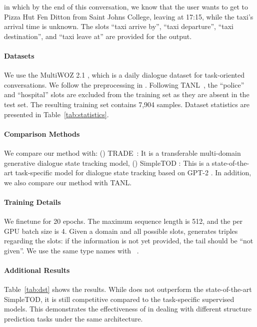 \noindent in which by the end of this conversation, we know that the user wants to get to Pizza Hut Fen Ditton from Saint Johns College, leaving at 17:15, while the taxi's arrival time is unknown. The slots ``taxi arrive by'', ``taxi departure'', ``taxi destination'', and ``taxi leave at'' are provided for the output.

\paragraph{Datasets} We use the MultiWOZ 2.1 \cite{budzianowski2018large, ramadan2018large, eric2019multiwoz, zang2020multiwoz}, which is a daily dialogue dataset for task-oriented conversations. We follow the preprocessing in \citep{wu2019transferable}. Following TANL~\cite{paolini2021structured}, the ``police'' and ``hospital'' slots are excluded from the training set as they are absent in the test set. The resulting training set contains 7,904 samples. Dataset statistics are presented in Table~\ref{tab:statistics}.

\paragraph{Comparison Methods} We compare our method with: (\expandafter{}) TRADE~\cite{wu2019transferable}: It is a transferable multi-domain generative dialogue state tracking model, (\expandafter{}) SimpleTOD \cite{hosseiniasl2020simple}: This is a state-of-the-art task-specific model for dialogue state tracking based on GPT-2 \cite{radford2019language}. In addition, we also compare our method with TANL.

\paragraph{Training Details}
We finetune for 20 epochs. The maximum sequence length is 512, and the per GPU batch size is 4. Given a domain and all possible slots, \method generates triples regarding the slots: if the information is not yet provided, the tail should be ``not given''. We use the same type names with ~\cite{paolini2021structured}.

\paragraph{Additional Results}
Table~\ref{tab:dst} shows the results. While \method does not outperform the state-of-the-art SimpleTOD, it is still competitive compared to the task-specific supervised models. This demonstrates the effectiveness of \method in dealing with different structure prediction tasks under the same architecture.

